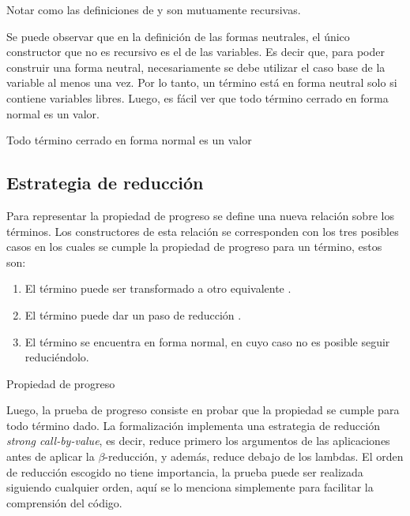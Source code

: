 Notar como las definiciones de \type{$\Uparrow$} y \type{$\Downarrow$} son mutuamente recursivas.

Se puede observar que en la definición de las formas neutrales, el único constructor que no es recursivo es el de las variables.
Es decir que, para poder construir una forma neutral, necesariamente se debe utilizar el caso base de la variable al menos una vez.
Por lo tanto, un término está en forma neutral solo si contiene variables libres.
Luego, es fácil ver que todo término cerrado en forma normal es un valor.

\begin{codigo}
	Todo término cerrado en forma normal es un valor
\end{codigo}

\subsection{Estrategia de reducción}

Para representar la propiedad de progreso se define una nueva relación  sobre los términos.
Los constructores de esta relación se corresponden con los tres posibles casos en los cuales se cumple la propiedad de progreso para un término, estos son:
\begin{enumerate}
	\item El término puede ser transformado a otro equivalente \type{$\_\rightleftarrows\_$}.
	\item El término puede dar un paso de reducción \type{$\_\hookrightarrow\_$}.
	\item El término se encuentra en forma normal, en cuyo caso no es posible seguir reduciéndolo.
\end{enumerate}

\begin{codigo}
	Propiedad de progreso
\end{codigo}

Luego, la prueba de progreso consiste en probar que la propiedad  se cumple para todo término dado.
La formalización implementa una estrategia de reducción \textit{strong call-by-value}, es decir, reduce primero los argumentos de las aplicaciones antes de aplicar la $\beta$-reducción, y además, reduce debajo de los lambdas.
El orden de reducción escogido no tiene importancia, la prueba puede ser realizada siguiendo cualquier orden, aquí se lo menciona simplemente para facilitar la comprensión del código.


